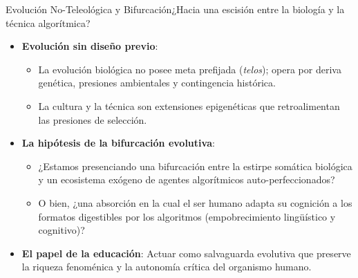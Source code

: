 \documentclass[aspectratio=169,11pt]{beamer}
\begin{document}
\begin{frame}{Evolución No-Teleológica y Bifurcación}{¿Hacia una
  escisión entre la biología y la técnica algorítmica?}
\begin{itemize}\setlength{\itemsep}{0.6em}
    \item \textbf{Evolución sin diseño previo}:
    \begin{itemize}\setlength{\itemsep}{0.3em}
        \item La evolución biológica no posee meta prefijada
          (\textit{telos}); opera por deriva genética, presiones
          ambientales y contingencia histórica.
        \item La cultura y la técnica son extensiones epigenéticas
          que retroalimentan las presiones de selección.
      \end{itemize}
    \item \textbf{La hipótesis de la bifurcación evolutiva}:
    \begin{itemize}\setlength{\itemsep}{0.3em}
        \item ¿Estamos presenciando una bifurcación entre la estirpe
          somática biológica y un ecosistema exógeno de agentes
          algorítmicos auto-perfeccionados?
        \item O bien, ¿una absorción en la cual el ser humano adapta
          su cognición a los formatos digestibles por los algoritmos
          (empobrecimiento lingüístico y cognitivo)?
      \end{itemize}
    \item \textbf{El papel de la educación}: Actuar como salvaguarda
      evolutiva que preserve la riqueza fenoménica y la autonomía
      crítica del organismo humano.
  \end{itemize}
\end{frame}
\end{document}
